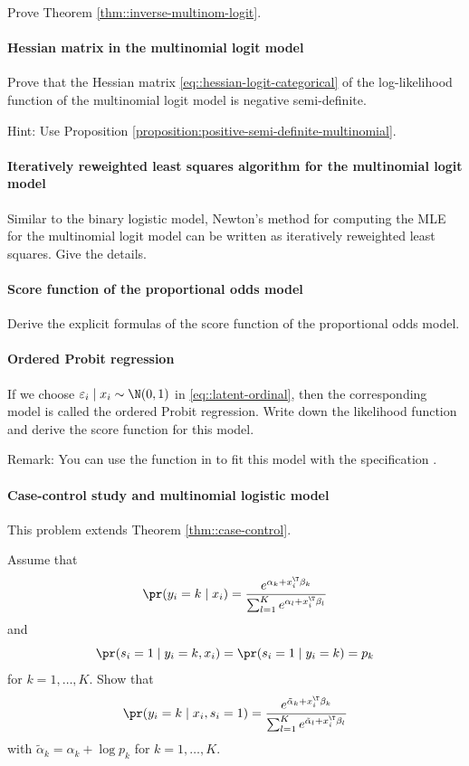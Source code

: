 Prove Theorem \ref{thm::inverse-multinom-logit}. 

 

\paragraph{Hessian matrix in the multinomial logit model}\label{hw18::hessian-multinom}

Prove that the Hessian matrix \eqref{eq::hessian-logit-categorical} of the log-likelihood function of the multinomial logit model is negative semi-definite. 


Hint: Use Proposition \ref{proposition:positive-semi-definite-multinomial}. 

\paragraph{Iteratively reweighted least squares algorithm for the multinomial logit model}\label{hw18::irls-multinom}

Similar to the binary logistic model, Newton's method for computing the MLE for the multinomial logit model can be written as iteratively reweighted least squares. Give the details. 

\paragraph{Score function of the proportional odds model}

Derive the explicit formulas of the score function of the proportional odds model. 


\paragraph{Ordered Probit regression}\label{hw18::ordered-probit}

If we choose $\varepsilon_i \mid x_i \sim \N(0,1)$ in \eqref{eq::latent-ordinal}, then the corresponding model is called the ordered Probit regression. Write down the likelihood function and derive the score function for this model. 

Remark: You can use the function  in  to fit this model with the specification . 

\paragraph{Case-control study and multinomial logistic model}\label{hw18::case-control-multinom}

This problem extends Theorem \ref{thm::case-control}. 

Assume that
$$
\pr(y_i = k\mid x_i) = \frac{  e^{\alpha_k + x_i^{\T} \beta_k} }{ \sum_{ l =1}^K e^{\alpha_{ l  }+ x_i^{\T} \beta_{ l }} }
$$
and 
$$
\pr(s_i =1\mid y_i = k, x_i) = \pr(s_i =1\mid y_i = k ) = p_k 
$$
for $k=1,\ldots, K$. 
Show that 
$$
\pr(y_i = k\mid x_i, s_i = 1) = \frac{  e^{\tilde \alpha_k  + x_i^{\T} \beta_k} }{ \sum_{ l =1}^K e^{\tilde \alpha_{ l  }   + x_i^{\T} \beta_{ l }} }
$$
with $\tilde \alpha_k = \alpha_k + \log p_k$ for $k=1,\ldots, K$. 
 

 
